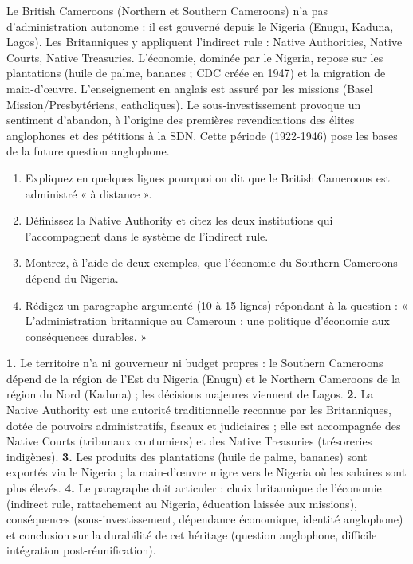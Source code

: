 \documentclass[11pt]{article}
\newcommand{\cle}[1]{{\popxbold\color{popdark}#1}}
\begin{document}
\begin{aretenir}
Le British Cameroons (Northern et Southern Cameroons) n'a pas d'administration autonome : il est gouverné depuis le Nigeria (Enugu, Kaduna, Lagos). Les Britanniques y appliquent l'\cle{indirect rule} : Native Authorities, Native Courts, Native Treasuries. L'économie, dominée par le Nigeria, repose sur les plantations (huile de palme, bananes ; CDC créée en 1947) et la migration de main-d'œuvre. L'enseignement en anglais est assuré par les missions (Basel Mission/Presbytériens, catholiques). Le sous-investissement provoque un sentiment d'abandon, à l'origine des premières revendications des élites anglophones et des pétitions à la SDN. Cette période (1922-1946) pose les bases de la future question anglophone.
\end{aretenir}

\begin{exercice}
\begin{enumerate}
\item Expliquez en quelques lignes pourquoi on dit que le British Cameroons est administré « à distance ».
\item Définissez la Native Authority et citez les deux institutions qui l'accompagnent dans le système de l'indirect rule.
\item Montrez, à l'aide de deux exemples, que l'économie du Southern Cameroons dépend du Nigeria.
\item Rédigez un paragraphe argumenté (10 à 15 lignes) répondant à la question : « L'administration britannique au Cameroun : une politique d'économie aux conséquences durables. »
\end{enumerate}
\end{exercice}

\begin{corrige}
\textbf{1.} Le territoire n'a ni gouverneur ni budget propres : le Southern Cameroons dépend de la région de l'Est du Nigeria (Enugu) et le Northern Cameroons de la région du Nord (Kaduna) ; les décisions majeures viennent de Lagos. \textbf{2.} La Native Authority est une autorité traditionnelle reconnue par les Britanniques, dotée de pouvoirs administratifs, fiscaux et judiciaires ; elle est accompagnée des Native Courts (tribunaux coutumiers) et des Native Treasuries (trésoreries indigènes). \textbf{3.} Les produits des plantations (huile de palme, bananes) sont exportés via le Nigeria ; la main-d'œuvre migre vers le Nigeria où les salaires sont plus élevés. \textbf{4.} Le paragraphe doit articuler : choix britannique de l'économie (indirect rule, rattachement au Nigeria, éducation laissée aux missions), conséquences (sous-investissement, dépendance économique, identité anglophone) et conclusion sur la durabilité de cet héritage (question anglophone, difficile intégration post-réunification).
\end{corrige}
\end{document}
